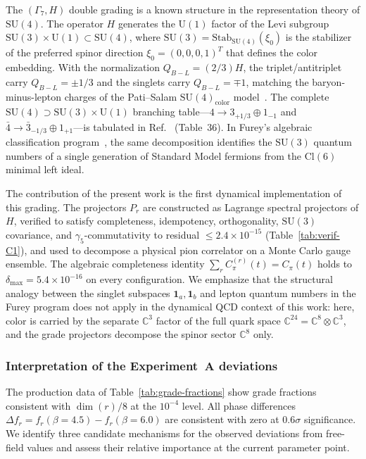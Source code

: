 \documentclass[12pt]{article}
\theoremstyle{definition}
\theoremstyle{remark}
\newcommand{\cl}{\mathrm{Cl}}           %
\newcommand{\su}{\mathrm{SU}}           %
\newcommand{\GaSeven}{\Gamma_7}                      %
\begin{document}
	The $(\GaSeven, H)$ double grading is a known structure in the representation
	theory of $\su(4)$.  The operator $H$ generates the $\mathrm{U}(1)$ factor of
	the Levi subgroup $\su(3)\times\mathrm{U}(1)\subset\su(4)$, where
	$\su(3) = \mathrm{Stab}_{\su(4)}(\xi_0)$ is the stabilizer of the preferred
	spinor direction $\xi_0=(0,0,0,1)^T$ that defines the color embedding.  With
	the normalization $Q_{B-L} = (2/3)H$, the triplet/antitriplet carry
	$Q_{B-L} = \pm1/3$ and the singlets carry $Q_{B-L} = \mp1$, matching the
	baryon-minus-lepton charges of the Pati--Salam $\su(4)_{\mathrm{color}}$
	model~\cite{PatiSalam1974}.  The complete $\su(4)\supset\su(3)\times\mathrm{U}(1)$
	branching table---$4\to3_{+1/3}\oplus1_{-1}$ and
	$\bar{4}\to\bar{3}_{-1/3}\oplus1_{+1}$---is tabulated in
	Ref.~\cite{Slansky1981} (Table~36).  In Furey's algebraic classification
	program~\cite{Furey2012,Furey2014,Furey2015,Furey2018a,Furey2018b}, the same
	decomposition identifies the $\su(3)$ quantum numbers of a single generation
	of Standard Model fermions from the $\cl(6)$ minimal left ideal.
	
	The contribution of the present work is the first dynamical implementation of
	this grading.  The projectors $P_r$ are constructed as Lagrange spectral
	projectors of $H$, verified to satisfy completeness, idempotency,
	orthogonality, $\su(3)$ covariance, and $\gamma_5$-commutativity to residual
	$\leq 2.4\times10^{-15}$ (Table~\ref{tab:verif-C1}), and used to decompose a
	physical pion correlator on a Monte Carlo gauge ensemble.  The algebraic
	completeness identity $\sum_r C_\pi^{(r)}(t) = C_\pi(t)$ holds to
	$\delta_{\max} = 5.4\times10^{-16}$ on every configuration.  We emphasize
	that the structural analogy between the singlet subspaces $\mathbf{1}_a,
	\mathbf{1}_b$ and lepton quantum numbers in the Furey program does not apply
	in the dynamical QCD context of this work: here, color is carried by the
	separate $\mathbb{C}^3$ factor of the full quark space
	$\mathbb{C}^{24} = \mathbb{C}^8\otimes\mathbb{C}^3$, and the grade projectors
	decompose the spinor sector $\mathbb{C}^8$ only.
	
	\subsubsection{Interpretation of the Experiment~A deviations}
	\label{sec:deviation-interp}
	
	The production data of Table~\ref{tab:grade-fractions} show grade fractions
	consistent with $\dim(r)/8$ at the $10^{-4}$ level.  All phase differences
	$\Delta f_r = f_r(\beta{=}4.5) - f_r(\beta{=}6.0)$ are consistent with zero
	at $0.6\sigma$ significance.  We identify three candidate mechanisms for the
	observed deviations from free-field values and assess their relative importance
	at the current parameter point.
	
\end{document}
